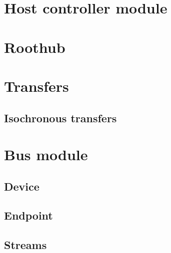 


\section{Host controller module}


\section{Roothub}


\section{Transfers}


\subsection{Isochronous transfers}


\section{Bus module}


\subsection{Device}


\subsection{Endpoint}


\subsection{Streams}

